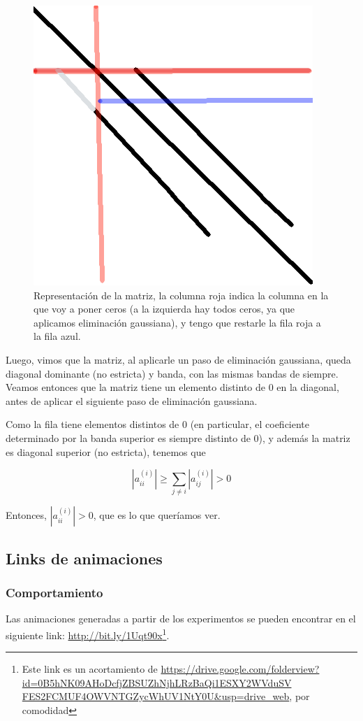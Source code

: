 \begin{figure}[H]
    \begin{center}
\includegraphics[scale=0.3]{imgs/expl.png}
\end{center}
\caption{\footnotesize{Representación de la matriz, la columna roja indica la columna en la que voy a poner ceros (a la izquierda hay todos ceros, ya que aplicamos eliminación gaussiana), y tengo que restarle la fila roja a la fila azul.}}
 \end{figure}

Luego, vimos que la matriz, al aplicarle un paso de eliminación gaussiana, queda diagonal dominante (no estricta) y banda, con las mismas bandas de siempre. Veamos entonces que la matriz tiene un elemento distinto de 0 en la diagonal, antes de aplicar el siguiente paso de eliminación gaussiana.

Como la fila tiene elementos distintos de 0 (en particular, el coeficiente determinado por la banda superior es siempre distinto de 0), y además la matriz es diagonal superior (no estricta), tenemos que

\[
  |a_{ii}^{(i)}| \geq \sum_{j \neq i} |a_{ij}^{(i)}| > 0
\]

Entonces, $|a_{ii}^{(i)}| > 0$, que es lo que queríamos ver.

\subsection{Links de animaciones}
\label{sec:links}

\subsubsection{Comportamiento}
Las animaciones generadas a partir de los experimentos se pueden encontrar en el siguiente link: \url{http://bit.ly/1Uqt90x}\footnote{Este link es un acortamiento de \newline \url{https://drive.google.com/folderview?id=0B5hNK09AHoDcfjZBSUZhNjhLRzBaQi1ESXY2WVduSV FES2FCMUF4OWVNTGZycWhUV1NtY0U&usp=drive_web}, por comodidad}.

